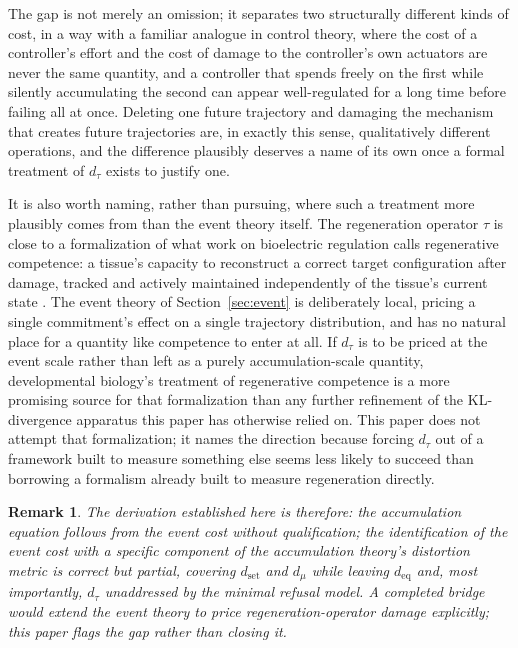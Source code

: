 \documentclass[11pt]{article}
\theoremstyle{plain}
\newtheorem{remark}{Remark}
\begin{document}
The gap is not merely an omission; it separates two structurally different kinds of cost, in a way with a familiar analogue in control theory, where the cost of a controller's effort and the cost of damage to the controller's own actuators are never the same quantity, and a controller that spends freely on the first while silently accumulating the second can appear well-regulated for a long time before failing all at once. Deleting one future trajectory and damaging the mechanism that creates future trajectories are, in exactly this sense, qualitatively different operations, and the difference plausibly deserves a name of its own once a formal treatment of $d_\tau$ exists to justify one.

It is also worth naming, rather than pursuing, where such a treatment more plausibly comes from than the event theory itself. The regeneration operator $\tau$ is close to a formalization of what work on bioelectric regulation calls regenerative competence: a tissue's capacity to reconstruct a correct target configuration after damage, tracked and actively maintained independently of the tissue's current state \citep{levin2021}. The event theory of Section~\ref{sec:event} is deliberately local, pricing a single commitment's effect on a single trajectory distribution, and has no natural place for a quantity like competence to enter at all. If $d_\tau$ is to be priced at the event scale rather than left as a purely accumulation-scale quantity, developmental biology's treatment of regenerative competence is a more promising source for that formalization than any further refinement of the KL-divergence apparatus this paper has otherwise relied on. This paper does not attempt that formalization; it names the direction because forcing $d_\tau$ out of a framework built to measure something else seems less likely to succeed than borrowing a formalism already built to measure regeneration directly.

\begin{remark}
The derivation established here is therefore: the accumulation equation follows from the event cost without qualification; the identification of the event cost with a specific component of the accumulation theory's distortion metric is correct but partial, covering $d_{\mathrm{set}}$ and $d_\mu$ while leaving $d_{\mathrm{eq}}$ and, most importantly, $d_\tau$ unaddressed by the minimal refusal model. A completed bridge would extend the event theory to price regeneration-operator damage explicitly; this paper flags the gap rather than closing it.
\end{remark}
\end{document}
